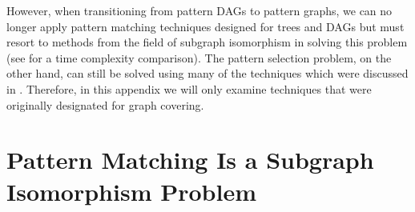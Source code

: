 %

However, when transitioning from \glspl{pattern DAG} to \glspl{pattern graph},
we can no longer apply \gls{pattern matching} techniques designed for
\glspl{tree} and \glspl{DAG} but must resort to methods from the field of
\gls{subgraph isomorphism} in solving this problem (see
 for a time complexity comparison).
%
The \gls{pattern selection} problem, on the other hand, can still be solved
using many of the techniques which were discussed in .
%
Therefore, in this appendix we will only examine techniques that were originally
designated for \gls{graph covering}.


\section{Pattern Matching Is a Subgraph Isomorphism Problem}

